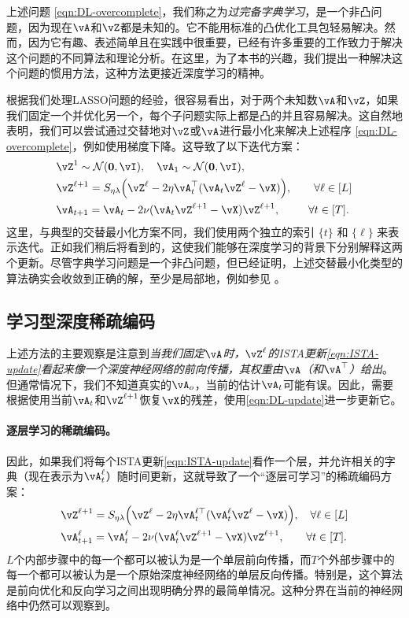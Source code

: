 \documentclass[../../book-main_zh.tex]{subfiles}
\begin{document}
上述问题 \eqref{eqn:DL-overcomplete}，我们称之为\textit{过完备字典学习}，是一个非凸问题，因为现在\(\vA\)和\(\vZ\)都是未知的。它不能用标准的凸优化工具包轻易解决。然而，因为它有趣、表述简单且在实践中很重要，已经有许多重要的工作致力于解决这个问题的不同算法和理论分析。在这里，为了本书的兴趣，我们提出一种解决这个问题的惯用方法，这种方法更接近深度学习的精神。

根据我们处理LASSO问题的经验，很容易看出，对于两个未知数\(\vA\)和\(\vZ\)，如果我们固定一个并优化另一个，每个子问题实际上都是凸的并且容易解决。这自然地表明，我们可以尝试通过交替地对\(\vZ\)或\(\vA\)进行最小化来解决上述程序 \eqref{eqn:DL-overcomplete}，例如使用梯度下降。这导致了以下迭代方案：
\begin{align}
    & \vZ^{1}
     \sim \dNorm(\vzero, \vI), \quad \vA_{1}
     \sim \dNorm(\vzero, \vI), \\ 
    &\vZ^{\ell + 1} = S_{\eta\lambda}\rp{\vZ^{\ell} - 2\eta\vA_{t}^{\top}(\vA_{t}\vZ^{\ell} - \vX)}, \qquad \forall \ell \in [L] \label{eqn:ISTA-update}\\ 
    &\vA_{t + 1} = \vA_{t} - 2\nu (\vA_{t}\vZ^{\ell + 1} - \vX)\vZ^{\ell + 1}, \qquad\;\; \forall t \in [T].\label{eqn:DL-update}
\end{align}
这里，与典型的交替最小化方案不同，我们使用两个独立的索引 $\{t\}$ 和 $\{\ell\}$ 来表示迭代。正如我们稍后将看到的，这使我们能够在深度学习的背景下分别解释这两个更新。尽管字典学习问题是一个非凸问题，但已经证明，上述交替最小化类型的算法确实会收敛到正确的解，至少是局部地，例如参见 \cite{alekh-2016}。


\subsection{学习型深度稀疏编码}
\label{sec:LISTA}
上述方法的主要观察是注意到\textit{当我们固定\(\vA\)时，$\vZ^\ell$的ISTA更新\eqref{eqn:ISTA-update}看起来像一个深度神经网络的前向传播，其权重由\(\vA\)（和\(\vA^{\top}\)）给出}。但通常情况下，我们不知道真实的$\vA_o$，当前的估计$\vA_t$可能有误。因此，需要根据使用当前$\vA_t$和$\vZ^{\ell +1}$恢复$\vX$的残差，使用\eqref{eqn:DL-update}进一步更新它。


\paragraph{逐层学习的稀疏编码。}
因此，如果我们将每个ISTA更新\eqref{eqn:ISTA-update}看作一个层，并允许相关的字典（现在表示为$\vA_t^\ell$）随时间更新，这就导致了一个“逐层可学习”的稀疏编码方案：
\begin{align}
    & \vZ^{\ell + 1} = S_{\eta\lambda}\rp{\vZ^{\ell} - 2\eta\vA_{t}^{\ell\top}(\vA_{t}^\ell\vZ^{\ell} - \vX)}, \quad \forall \ell \in [L] \\ 
    & \vA_{t + 1}^\ell = \vA_{t}^\ell - 2\nu (\vA_{t}^\ell\vZ^{\ell + 1} - \vX)\vZ^{\ell + 1}, \qquad \forall t \in [T].
\end{align}
\(L\)个内部步骤中的每一个都可以被认为是一个单层前向传播，而\(T\)个外部步骤中的每一个都可以被认为是一个原始深度神经网络的单层反向传播。特别是，这个算法是前向优化和反向学习之间出现明确分界的最简单情况。这种分界在当前的神经网络中仍然可以观察到。
\end{document}
